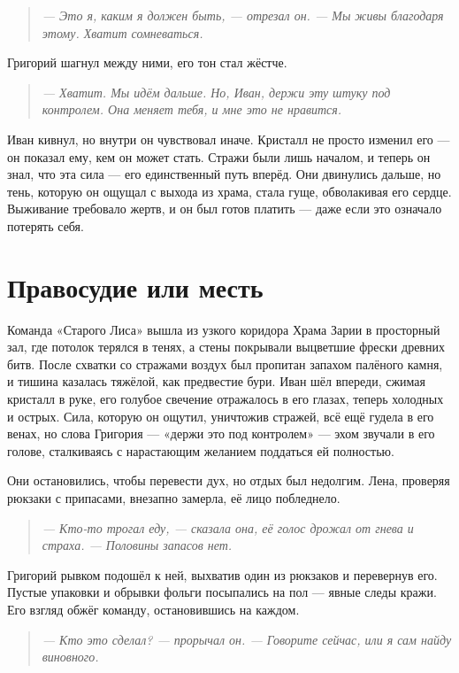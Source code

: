 \documentclass[12pt,a4paper]{book} %
\newenvironment{dialogue}{\begin{quote}\itshape}{\end{quote}}
\begin{document}
\begin{dialogue}
--- Это я, каким я должен быть, --- отрезал он. --- Мы живы благодаря этому. Хватит сомневаться.
\end{dialogue}

Григорий шагнул между ними, его тон стал жёстче.

\begin{dialogue}
--- Хватит. Мы идём дальше. Но, Иван, держи эту штуку под контролем. Она меняет тебя, и мне это не нравится.
\end{dialogue}

Иван кивнул, но внутри он чувствовал иначе. Кристалл не просто изменил его --- он показал ему, кем он может стать. Стражи были лишь началом, и теперь он знал, что эта сила --- его единственный путь вперёд. Они двинулись дальше, но тень, которую он ощущал с выхода из храма, стала гуще, обволакивая его сердце. Выживание требовало жертв, и он был готов платить --- даже если это означало потерять себя.

\chapter{Правосудие или месть}

Команда «Старого Лиса» вышла из узкого коридора Храма Зарии в просторный зал, где потолок терялся в тенях, а стены покрывали выцветшие фрески древних битв. После схватки со стражами воздух был пропитан запахом палёного камня, и тишина казалась тяжёлой, как предвестие бури. Иван шёл впереди, сжимая кристалл в руке, его голубое свечение отражалось в его глазах, теперь холодных и острых. Сила, которую он ощутил, уничтожив стражей, всё ещё гудела в его венах, но слова Григория --- «держи это под контролем» --- эхом звучали в его голове, сталкиваясь с нарастающим желанием поддаться ей полностью.

Они остановились, чтобы перевести дух, но отдых был недолгим. Лена, проверяя рюкзаки с припасами, внезапно замерла, её лицо побледнело.

\begin{dialogue}
--- Кто-то трогал еду, --- сказала она, её голос дрожал от гнева и страха. --- Половины запасов нет.
\end{dialogue}

Григорий рывком подошёл к ней, выхватив один из рюкзаков и перевернув его. Пустые упаковки и обрывки фольги посыпались на пол --- явные следы кражи. Его взгляд обжёг команду, остановившись на каждом.

\begin{dialogue}
--- Кто это сделал? --- прорычал он. --- Говорите сейчас, или я сам найду виновного.
\end{dialogue}
\end{document}
